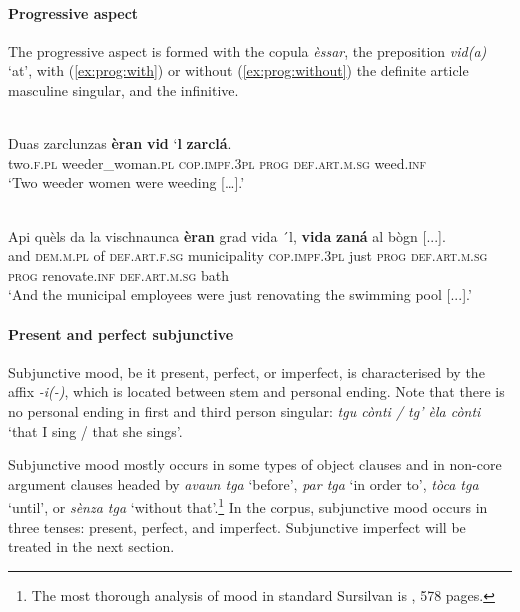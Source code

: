 \paragraph{Progressive aspect}
The progressive aspect is formed with the copula \textit{èssar}, the preposition \textit{vid(a)} ‘at’, with (\ref{ex:prog:with}) or without (\ref{ex:prog:without}) the definite article masculine singular, and the infinitive.

\ea\label{ex:prog:with}
 {\citealt[132]{Büchli1966}}\\
\gll    Duas zarclunzas \textbf{èran} \textbf{vid} `\textbf{l} \textbf{zarclá}.\\
     two.\textsc{f.pl} weeder\_woman.\textsc{pl} \textsc{cop.impf.3pl} \textsc{prog} \textsc{def.art.m.sg} weed.\textsc{inf}\\
\glt `Two weeder women were weeding […].'
\z

\ea\label{ex:prog:without}
\\
\gll  Api quèls da la vischnaunca \textbf{èran} grad vida ´l, \textbf{vida} \textbf{zaná} al bògn [...].  \\
and \textsc{dem.m.pl} of \textsc{def.art.f.sg} municipality \textsc{cop.impf.3pl} just \textsc{prog} \textsc{def.art.m.sg} \textsc{prog} renovate.\textsc{inf} \textsc{def.art.m.sg} bath\\
\glt `And the municipal employees were just renovating the swimming pool [...].'
\z

\paragraph{Present and perfect subjunctive}
Subjunctive mood, be it present, perfect, or imperfect, is characterised by the affix \textit{-i(-)}, which is located between stem and personal ending. Note that there is no personal ending in first and third person singular: \textit{tgu cònti / tg' èla cònti} `that I sing / that she sings'.

Subjunctive mood mostly occurs in some types of object clauses and in non-core argument clauses headed by \textit{avaun tga} `before', \textit{par tga} `in order to', \textit{tòca tga} `until', or \textit{sènza tga} `without that'.\footnote{The most thorough analysis of mood in standard Sursilvan is \citet{Grünert2003}, 578 pages.} In the corpus, subjunctive mood occurs in three tenses: present, perfect, and imperfect. Subjunctive imperfect will be treated in the next section.

